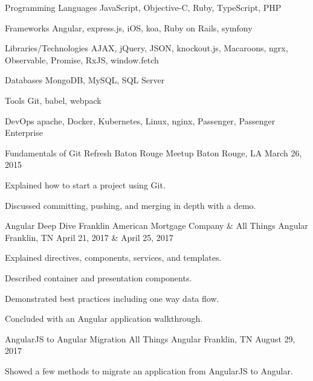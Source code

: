 \documentclass[letterpaper]{awesome-cv}
\begin{document}
\begin{cvskills}
	\cvskill
    {Programming Languages}
    {JavaScript, Objective-C, Ruby, TypeScript, PHP}

  \cvskill
    {Frameworks}
    {Angular, express.js, iOS, koa, Ruby on Rails, symfony}

  \cvskill
    {Libraries/Technologies}
    {AJAX, jQuery, JSON, knockout.js, Macaroons, ngrx, Observable, Promise, RxJS, window.fetch}

  \cvskill
    {Databases}
    {MongoDB, MySQL, SQL Server}

  \cvskill
    {Tools}
    {Git, babel, webpack}

  \cvskill
    {DevOps}
    {apache, Docker, Kubernetes, Linux, nginx, Passenger, Passenger Enterprise}
\end{cvskills}
\begin{cventries}
  \cventry
    {Fundamentals of Git}
    {Refresh Baton Rouge Meetup}
    {Baton Rouge, LA}
    {March 26, 2015}
    {
      \begin{cvitems}
        \item {Explained how to start a project using Git.}
        \item {Discussed committing, pushing, and merging in depth with a demo.}
      \end{cvitems}
    }

  \cventry
    {Angular Deep Dive}
    {Franklin American Mortgage Company \& All Things Angular}
    {Franklin, TN}
    {April 21, 2017 \& April 25, 2017}
    {
      \begin{cvitems}
        \item {Explained directives, components, services, and templates.}
        \item {Described container and presentation components.}
        \item {Demonstrated best practices including one way data flow.}
        \item {Concluded with an Angular application walkthrough.}
      \end{cvitems}
    }

  \cventry
    {AngularJS to Angular Migration}
    {All Things Angular}
    {Franklin, TN}
    {August 29, 2017}
    {
      \begin{cvitems}
        \item {Showed a few methods to migrate an application from AngularJS to Angular.}
      \end{cvitems}
    }
\end{cventries}
\end{document}
